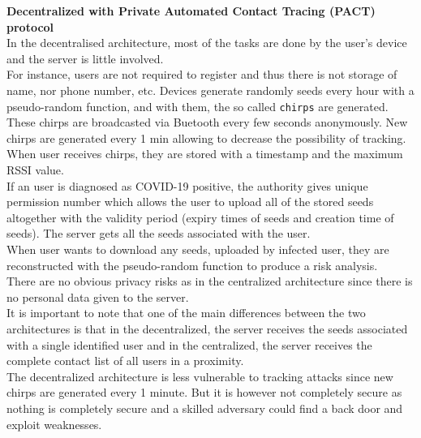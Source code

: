 \documentclass[a4paper, twocolumn]{article}
\begin{document}
\noindent \textbf{Decentralized with Private Automated Contact Tracing (PACT) protocol}\\
In the decentralised architecture, most of the tasks are done by the user's device and the server is little involved.\\
For instance, users are not required to register and thus there is not storage of name, nor phone number, etc. Devices generate randomly seeds every hour with a pseudo-random function, and with them, the so called \texttt{chirps} are generated. These chirps are broadcasted via Buetooth every few seconds anonymously. New chirps are generated every 1 min allowing to decrease the possibility of tracking. When user receives chirps, they are stored with a timestamp and the maximum RSSI value.\\
If an user is diagnosed as COVID-19 positive, the authority gives unique permission number which allows the user to upload all of the stored seeds altogether with the validity period (expiry times of seeds and creation time of seeds). The server gets all the seeds associated with the user.\\
When user wants to download any seeds, uploaded by infected user, they are reconstructed with the pseudo-random function to produce a risk analysis.\\

\noindent There are no obvious privacy risks as in the centralized architecture since there is no personal data given to the server.\\
It is important to note that one of the main differences between the two architectures is that in the decentralized, the server receives the seeds associated with a single identified user and in the centralized, the server receives the complete contact list of all users in a proximity.\\
The decentralized architecture is less vulnerable to tracking attacks since new chirps are generated every 1 minute. But it is however not completely secure as nothing is completely secure and a skilled adversary could find a back door and exploit weaknesses.\\
\end{document}
